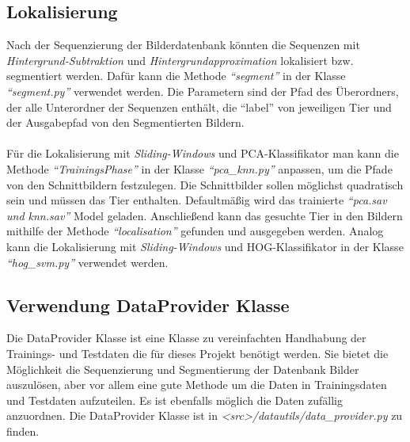\subsection*{Lokalisierung} \label{ssec:Tut:Loc}
Nach der Sequenzierung der Bilderdatenbank könnten die Sequenzen mit \textit{Hintergrund-Subtraktion} und \textit{Hintergrundapproximation} lokalisiert bzw. segmentiert werden. Dafür kann die Methode \textit{``segment''} in der Klasse \textit{``segment.py''} verwendet werden.
Die Parametern sind der Pfad des Überordners, der alle Unterordner der Sequenzen enthält, die ``label'' von jeweiligen Tier und der Ausgabepfad von den Segmentierten Bildern.\\\\
Für die Lokalisierung mit \textit{Sliding-Windows} und PCA-Klassifikator man kann die Methode \textit{``TrainingsPhase''} in der Klasse \textit{``pca\_knn.py''} anpassen, um die Pfade von den Schnittbildern festzulegen. Die Schnittbilder sollen möglichst quadratisch sein und müssen das Tier enthalten. Defaultmäßig wird das trainierte \textit{``pca.sav und knn.sav''} Model geladen. Anschließend kann das gesuchte Tier in den Bildern mithilfe der Methode \textit{``localisation''} gefunden und ausgegeben werden. Analog kann die Lokalisierung mit \textit{Sliding-Windows} und HOG-Klassifikator in der Klasse \textit{``hog\_svm.py''} verwendet werden.

\subsection*{Verwendung DataProvider Klasse} \label{sec:Tut:DataProvider}
Die DataProvider Klasse ist eine Klasse zu vereinfachten Handhabung der Trainings- und Testdaten die für dieses Projekt benötigt werden. Sie bietet die Möglichkeit die Sequenzierung und Segmentierung der Datenbank Bilder auszulösen, aber vor allem eine gute Methode um die Daten in Trainingsdaten und Testdaten aufzuteilen. Es ist ebenfalls möglich die Daten zufällig anzuordnen. Die DataProvider Klasse ist in \emph{<src>/datautils/data\_provider.py} zu finden.


